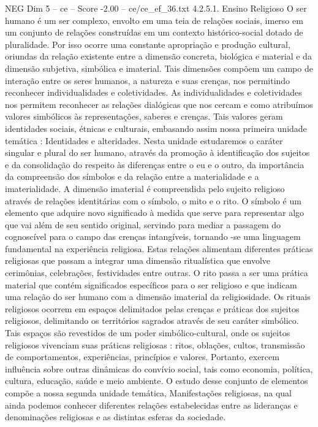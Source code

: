 \begin{textsample}{NEG Dim 5 – ce – Score -2.00 – ce/ce\_ef\_36.txt}  \label{ex:f5_neg_033}
4.2.5.1.
Ensino Religioso O ser humano é um ser complexo, envolto em uma teia de relações sociais, imerso em um conjunto de relações construídas em um contexto histórico-social dotado de pluralidade.
Por isso ocorre uma constante apropriação e produção cultural, oriundas da relação existente entre a dimensão concreta, biológica e material e da dimensão subjetiva, simbólica e imaterial.
Tais dimensões compõem um campo de interação entre os seres humanos, a natureza e suas crenças, nos permitindo reconhecer individualidades e coletividades.
As individualidades e coletividades nos permitem reconhecer as relações dialógicas que nos cercam e como atribuímos valores simbólicos às representações, saberes e crenças.
Tais valores geram identidades sociais, étnicas e culturais, embasando assim nossa primeira unidade temática : Identidades e alteridades.
Nesta unidade estudaremos o caráter singular e plural do ser humano, através da promoção à identificação dos sujeitos e da consolidação do respeito às diferenças entre o eu e o outro, da importância da compreensão dos símbolos e da relação entre a materialidade e a imaterialidade.
A dimensão imaterial é compreendida pelo sujeito religioso através de relações identitárias com o símbolo, o mito e o rito.
O símbolo é um elemento que adquire novo significado à medida que serve para representar algo que vai além de seu sentido original, servindo para mediar a passagem do cognoscível para o campo das crenças intangíveis, tornando -se uma linguagem fundamental na experiência religiosa.
Estas relações alimentam diferentes práticas religiosas que passam a integrar uma dimensão ritualística que envolve cerimônias, celebrações, festividades entre outras.
O rito passa a ser uma prática material que contém significados específicos para o ser religioso e que indicam uma relação do ser humano com a dimensão imaterial da religiosidade.
Os rituais religiosos ocorrem em espaços delimitados pelas crenças e práticas dos sujeitos religiosos, delimitando os territórios sagrados através de seu caráter simbólico.
Tais espaços são revestidos de um poder simbólico-cultural, onde os sujeitos religiosos vivenciam suas práticas religiosas : ritos, oblações, cultos, transmissão de comportamentos, experiências, princípios e valores.
Portanto, exercem influência sobre outras dinâmicas do convívio social, tais como economia, política, cultura, educação, saúde e meio ambiente.
O estudo desse conjunto de elementos compõe a nossa segunda unidade temática, Manifestações religiosas, na qual ainda podemos conhecer diferentes relações estabelecidas entre as lideranças e denominações religiosas e as distintas esferas da sociedade.

\end{textsample}
